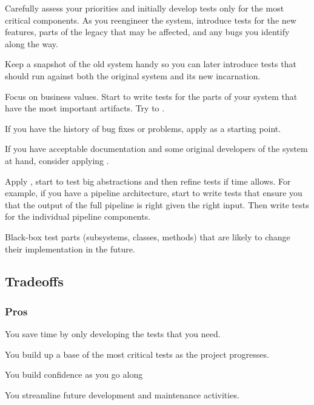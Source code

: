 \documentclass[a4paper,10pt,twoside]{book}
\begin{document}
\begin{bulletlist}
\item Carefully assess your priorities and initially develop tests only for the most critical components. As you reengineer the system, introduce tests for the new features, parts of the legacy that may be affected, and any bugs you identify along the way. 
\item Keep a snapshot of the old system handy so you can later introduce tests that should run against both the original system and its new incarnation.
\item Focus on business values. Start to write tests for the parts of your system that have the most important artifacts. Try to .
\item If you have the history of bug fixes or problems, apply  as a starting point.
\item If you have acceptable documentation and some original developers of the system at hand, consider applying .
\item Apply , start to test big abstractions and then refine tests if time allows. For example, if you have a pipeline architecture, start to write tests that ensure you that the output of the full pipeline is right given the right input. Then write tests for the individual pipeline components.
\item Black-box test parts (subsystems, classes, methods) that are likely to change their implementation in the future.
\end{bulletlist}

\subsection*{Tradeoffs}

\subsubsection*{Pros}

\begin{bulletlist}
\item You save time by only developing the tests that you need.
\item You build up a base of the most critical tests as the project progresses.
\item You build confidence as you go along
\item You streamline future development and maintenance activities.
\end{bulletlist}
\end{document}
